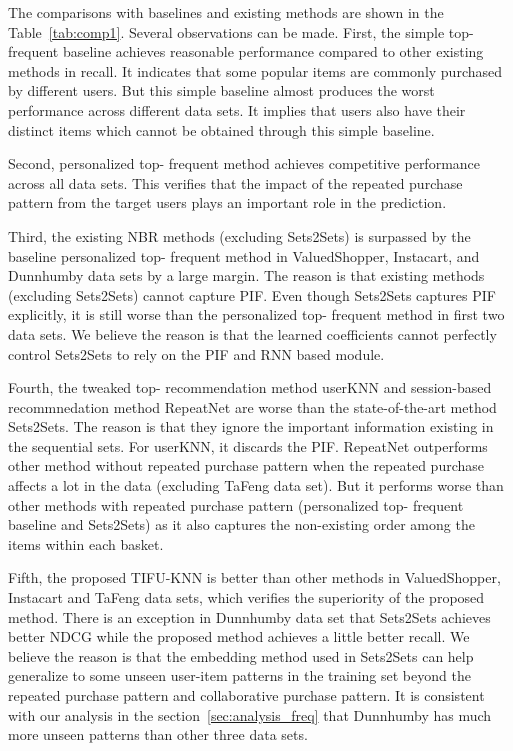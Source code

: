 \documentclass[sigconf]{acmart}
\begin{document}
The comparisons with baselines and existing  methods are shown in the Table~\ref{tab:comp1}. Several observations can be  made. First, the simple  top- frequent  baseline achieves  reasonable  performance  compared to other  existing methods in recall.  It indicates that  some popular items are commonly purchased by  different users. But this simple baseline almost produces the worst performance across different data sets. It implies that users also have their distinct items which cannot be obtained through this simple baseline. 

Second, personalized top- frequent  method achieves competitive performance across all data sets. This verifies that the impact of the repeated purchase pattern from  the target users plays an  important role in the  prediction. 

Third,  the existing NBR methods (excluding Sets2Sets) is  surpassed by the baseline  personalized top-  frequent  method in ValuedShopper,  Instacart, and Dunnhumby data sets  by a large margin. The  reason is that existing methods  (excluding  Sets2Sets) cannot capture  PIF. Even though Sets2Sets  captures  PIF explicitly, it is still worse than the personalized top-  frequent method in first two data sets.  We believe the reason is that the  learned coefficients cannot perfectly control Sets2Sets to rely on the PIF and RNN based module. 

Fourth, the tweaked top- recommendation method userKNN and session-based recommnedation method RepeatNet are worse than  the state-of-the-art  method Sets2Sets. The  reason is that they ignore the important information existing in the sequential sets. For userKNN, it discards the PIF. RepeatNet outperforms other method without repeated purchase  pattern when the repeated purchase affects a lot in the data (excluding TaFeng data set). But it performs worse than other methods with repeated purchase pattern (personalized  top- frequent baseline and Sets2Sets) as it also captures the non-existing order among the items within each basket. 

Fifth, the proposed  TIFU-KNN is better than other methods in  ValuedShopper,  Instacart and TaFeng data sets,  which verifies the  superiority of the proposed method. There is an exception in Dunnhumby data set that Sets2Sets  achieves better NDCG  while the proposed method achieves a little better recall. We believe the reason is that the embedding method used in  Sets2Sets can help generalize to some unseen user-item patterns in the training set beyond the repeated purchase pattern and collaborative purchase pattern. It is consistent with our analysis in the section~\ref{sec:analysis_freq} that Dunnhumby has much more unseen patterns than other three data sets. 
\end{document}
